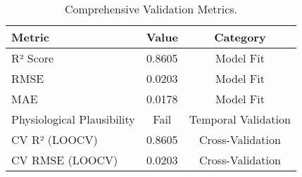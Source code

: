 \begin{table}
\caption{Comprehensive Validation Metrics.}
\label{tab:validation_summary}
\begin{tabular}{lcc}
\toprule
Metric & Value & Category \\
\midrule
R² Score & 0.8605 & Model Fit \\
RMSE & 0.0203 & Model Fit \\
MAE & 0.0178 & Model Fit \\
Physiological Plausibility & Fail & Temporal Validation \\
CV R² (LOOCV) & 0.8605 & Cross-Validation \\
CV RMSE (LOOCV) & 0.0203 & Cross-Validation \\
\bottomrule
\end{tabular}
\end{table}
